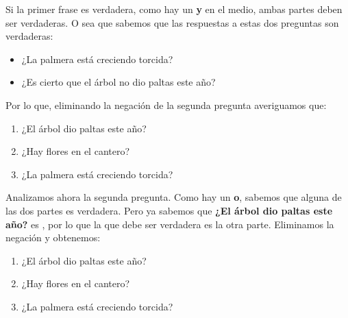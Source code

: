 \documentclass[12pt, addpoints]{../../common/epyl_exam_template}
\begin{document}
\begin{questions}
    \begin{solution}
      Si la primer frase es verdadera, como hay un \textbf{y} en el medio,
      ambas partes deben ser verdaderas. O sea que sabemos que las respuestas
      a estas dos preguntas son verdaderas:
      \begin{itemize}
        \item ¿La palmera está creciendo torcida?
        \item ¿Es cierto que el árbol no dio paltas este año?
      \end{itemize}

      Por lo que, eliminando la negación de la segunda pregunta averiguamos que:
      
      \begin{enumerate}
        \item ¿El árbol dio paltas este año? \fullfalse
        \item ¿Hay flores en el cantero?
        \item ¿La palmera está creciendo torcida? \fulltrue
      \end{enumerate}

      Analizamos ahora la segunda pregunta. Como hay un \textbf{o}, sabemos que
      alguna de las dos partes es verdadera. Pero ya sabemos que
      \textbf{¿El árbol dio paltas este año?} es \fullfalse, por lo que la que debe
      ser verdadera es la otra parte. Eliminamos la negación y obtenemos:

      \begin{enumerate}
        \item ¿El árbol dio paltas este año? \fullfalse
        \item ¿Hay flores en el cantero? \fullfalse
        \item ¿La palmera está creciendo torcida? \fulltrue
      \end{enumerate}
    \end{solution}


\end{questions}
\end{document}
